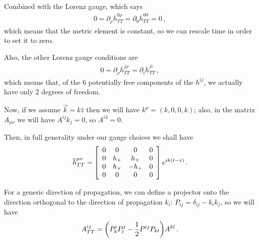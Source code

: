\documentclass[main.tex]{subfiles}
\begin{document}
Combined with the Lorenz gauge, which says 
%
\begin{align}
0= \partial_{\rho } \overline{h}^{0 \rho }_{TT} = \partial_{0} \overline{h}^{00}_{TT} = 0
\,,
\end{align}
%
which means that the metric element is constant, so we can rescale time in order to set it to zero. 

Also, the other Lorenz gauge conditions are 
%
\begin{align}
0= \partial_{\rho } \overline{h}^{j \rho }_{TT} = \partial_{i} \overline{h}^{ji}_{TT}
\,,
\end{align}
%
which means that, of the 6 potentially free components of the \(h^{ij}\), we actually have only 2 degrees of freedom.

Now, if we assume \(\vec{k} = k \hat{z}\) then we will have \(k^{\mu } = (k, 0, 0, k)\); also, in the matrix \(A_{\mu \nu }\) we will have \(A^{ij}k_{j} = 0\), so \(A^{i3}=0\). 

Then, in full generality under our gauge choices we shall have 
%
\begin{align}
\overline{h}^{\mu \nu }_{TT} = \left[\begin{array}{cccc}
0 & 0 & 0 & 0 \\ 
0 & h_{+} & h_{ \times } & 0 \\ 
0 & h_{ \times } & - h_{+} & 0 \\ 
0 & 0 & 0 & 0
\end{array}\right]
e^{i k \qty(t -z)}
\,.
\end{align}

For a generic direction of propagation, we can define a projector onto the direction orthogonal to the direction of propagation \(k_{i}\): \(P_{ij} = \delta_{ij} - k_i k_j\), so we will have 
%
\begin{align}
A^{ij}_{TT} = \qty(P^{i}_{k} P^{j}_{l} - \frac{1}{2} P^{ij} P_{kl})A^{kl}
\,.
\end{align}
\end{document}

